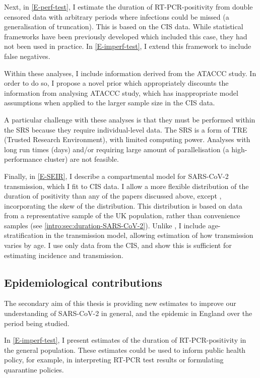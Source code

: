\documentclass[thesis.tex]{subfiles}
\begin{document}
Next, in \cref{E-perf-test}, I estimate the duration of RT-PCR-positivity from double censored data with arbitrary periods where infections could be missed (a generalisation of truncation).
This is based on the CIS data.
While statistical frameworks have been previously developed which included this case, they had not been used in practice.
In \cref{E-imperf-test}, I extend this framework to include false negatives.

Within these analyses, I include information derived from the ATACCC study.
In order to do so, I propose a novel prior which appropriately discounts the information from analysing ATACCC study, which has inappropriate model assumptions when applied to the larger sample size in the CIS data.

A particular challenge with these analyses is that they must be performed within the SRS because they require individual-level data.
The SRS is a form of TRE (Trusted Research Environment), with limited computing power.
Analyses with long run times (\ie days) and/or requiring large amount of parallelisation (\eg a high-performance cluster) are not feasible.


Finally, in \cref{E-SEIR}, I describe a compartmental model for SARS-CoV-2 transmission, which I fit to CIS data.
I allow a more flexible distribution of the duration of positivity than any of the papers discussed above, except \textcite{nicholsonImproving}, incorporating the skew of the distribution.
This distribution is based on data from a representative sample of the UK population, rather than convenience samples (see \cref{intro:sec:duration-SARS-CoV-2}).
Unlike \textcite{nicholsonImproving}, I include age-stratification in the transmission model, allowing estimation of how transmission varies by age.
I use only data from the CIS, and show this is sufficient for estimating incidence and transmission.

\subsection{Epidemiological contributions}

The secondary aim of this thesis is providing new estimates to improve our understanding of SARS-CoV-2 in general, and the epidemic in England over the period being studied.

In \cref{E-imperf-test}, I present estimates of the duration of RT-PCR-positivity in the general population.
These estimates could be used to inform public health policy, for example, in interpreting RT-PCR test results or formulating quarantine policies.
\end{document}
